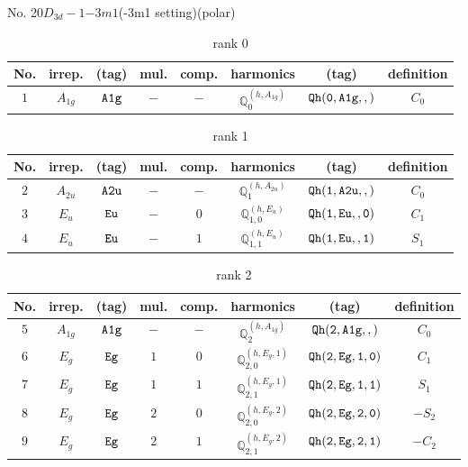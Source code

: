 \documentclass[fleqn,8pt]{jsarticle}
\begin{document}
\setcounter{MaxMatrixCols}{16}

\begin{center}
\LARGE
No. 20\quad$D_{3d}-1$\quad$-3m1$\quad(-3m1 setting)\quad[ trigonal ] (polar)
\end{center}
\begin{table}[ht!]
\begin{center}
\caption{rank 0}
\renewcommand{\arraystretch}{1.3}
\begin{tabular}{cccccccc} \hline \hline
No. & irrep. & (tag) & mul. & comp. & harmonics & (tag) & definition \\ \hline
$ 1 $ & $ A_{1g} $ & $ {\tt A1g} $ & $ - $ & $ - $ & $ \mathbb{Q}_{0}^{(h,A_{1g})} $ & $ {\tt Qh(0,A1g,,)} $ & $ C_{0} $ \\
 \hline \hline
\end{tabular}
\end{center}
\end{table}
\begin{table}[ht!]
\begin{center}
\caption{rank 1}
\renewcommand{\arraystretch}{1.3}
\begin{tabular}{cccccccc} \hline \hline
No. & irrep. & (tag) & mul. & comp. & harmonics & (tag) & definition \\ \hline
$ 2 $ & $ A_{2u} $ & $ {\tt A2u} $ & $ - $ & $ - $ & $ \mathbb{Q}_{1}^{(h,A_{2u})} $ & $ {\tt Qh(1,A2u,,)} $ & $ C_{0} $ \\
$ 3 $ & $ E_{u} $ & $ {\tt Eu} $ & $ - $ & $ 0 $ & $ \mathbb{Q}_{1,0}^{(h,E_{u})} $ & $ {\tt Qh(1,Eu,,0)} $ & $ C_{1} $ \\
$ 4 $ & $ E_{u} $ & $ {\tt Eu} $ & $ - $ & $ 1 $ & $ \mathbb{Q}_{1,1}^{(h,E_{u})} $ & $ {\tt Qh(1,Eu,,1)} $ & $ S_{1} $ \\
 \hline \hline
\end{tabular}
\end{center}
\end{table}
\begin{table}[ht!]
\begin{center}
\caption{rank 2}
\renewcommand{\arraystretch}{1.3}
\begin{tabular}{cccccccc} \hline \hline
No. & irrep. & (tag) & mul. & comp. & harmonics & (tag) & definition \\ \hline
$ 5 $ & $ A_{1g} $ & $ {\tt A1g} $ & $ - $ & $ - $ & $ \mathbb{Q}_{2}^{(h,A_{1g})} $ & $ {\tt Qh(2,A1g,,)} $ & $ C_{0} $ \\
$ 6 $ & $ E_{g} $ & $ {\tt Eg} $ & $ 1 $ & $ 0 $ & $ \mathbb{Q}_{2,0}^{(h,E_{g},1)} $ & $ {\tt Qh(2,Eg,1,0)} $ & $ C_{1} $ \\
$ 7 $ & $ E_{g} $ & $ {\tt Eg} $ & $ 1 $ & $ 1 $ & $ \mathbb{Q}_{2,1}^{(h,E_{g},1)} $ & $ {\tt Qh(2,Eg,1,1)} $ & $ S_{1} $ \\
$ 8 $ & $ E_{g} $ & $ {\tt Eg} $ & $ 2 $ & $ 0 $ & $ \mathbb{Q}_{2,0}^{(h,E_{g},2)} $ & $ {\tt Qh(2,Eg,2,0)} $ & $ - S_{2} $ \\
$ 9 $ & $ E_{g} $ & $ {\tt Eg} $ & $ 2 $ & $ 1 $ & $ \mathbb{Q}_{2,1}^{(h,E_{g},2)} $ & $ {\tt Qh(2,Eg,2,1)} $ & $ - C_{2} $ \\
 \hline \hline
\end{tabular}
\end{center}
\end{table}
\end{document}
